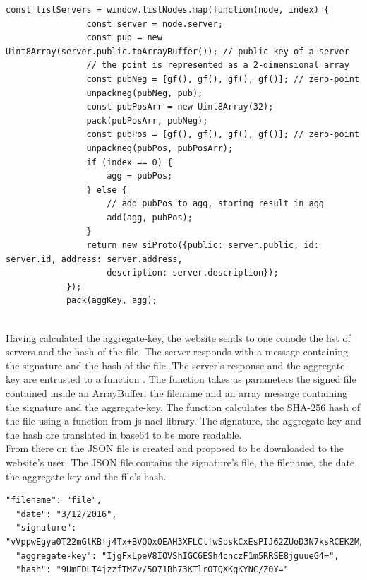 \documentclass[11pt, a4paper, twoside, openright, openany]{book} %
\begin{document}
\begin{lstlisting}[caption={Extract of the code calculating the aggregate-key}, captionpos=b]
  const listServers = window.listNodes.map(function(node, index) {
                const server = node.server;
                const pub = new Uint8Array(server.public.toArrayBuffer()); // public key of a server
                // the point is represented as a 2-dimensional array
                const pubNeg = [gf(), gf(), gf(), gf()]; // zero-point
                unpackneg(pubNeg, pub);
                const pubPosArr = new Uint8Array(32);
                pack(pubPosArr, pubNeg);
                const pubPos = [gf(), gf(), gf(), gf()]; // zero-point
                unpackneg(pubPos, pubPosArr);
                if (index == 0) {
                    agg = pubPos;
                } else {
                    // add pubPos to agg, storing result in agg
                    add(agg, pubPos);
                }
                return new siProto({public: server.public, id: server.id, address: server.address,
                    description: server.description});
            });
            pack(aggKey, agg);
\end{lstlisting}
\leavevmode \\

Having calculated the aggregate-key, the website sends to one conode the list of servers
and the hash of the file. The server responds with a message containing the signature
and the hash of the file. The server's response and the aggregate-key are entrusted to a function .
The function takes as parameters the signed file contained inside an ArrayBuffer,
the filename and an array message containing the signature and the aggregate-key.
The function calculates the SHA-256 hash of the file using a function from js-nacl library.
The signature, the aggregate-key and the hash are translated in base64 to be more readable.\\

From there on the JSON file is created and proposed to be downloaded to the website's user.
The JSON file contains the signature's file, the filename, the date, the aggregate-key and the file's hash.\\

\begin{lstlisting}[caption={Example a downloadable JSON file}, captionpos=b]
  "filename": "file",
  "date": "3/12/2016",
  "signature": "vVppwEgya0T22mGlKBfj4Tx+BVQQx0EAH3XFLClfwSbskCxEsPIJ62ZUoD3N7ksRCEK2M/XA6flV2tLsiQmrAf4=",
  "aggregate-key": "IjgFxLpeV8IOVShIGC6ESh4cnczF1m5RRSE8jguueG4=",
  "hash": "9UmFDLT4jzzfTMZv/5O71Bh73KTlrOTQXKgKYNC/Z0Y="
\end{lstlisting}
\leavevmode \\
\end{document}
